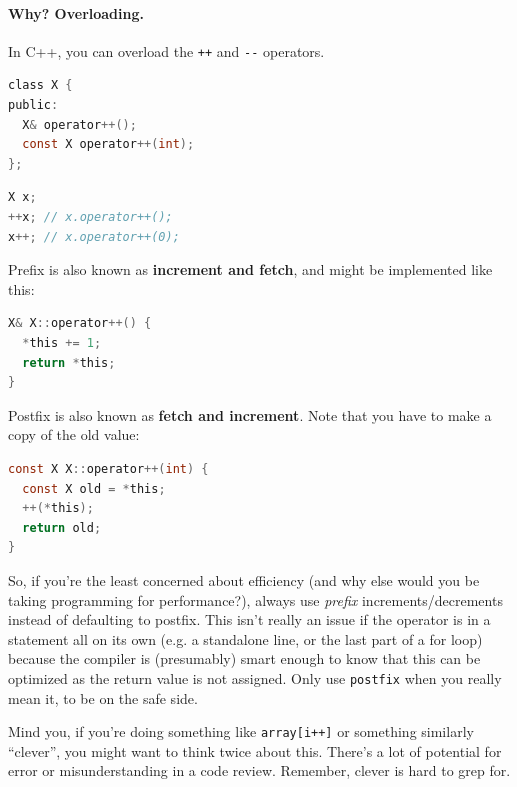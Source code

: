 \documentclass[a4paper]{report}
\begin{document}
\paragraph{Why? Overloading.} In C++, you can overload the {\tt ++} and {\tt -\!-} operators.

\vspace*{-1em}
\begin{minipage}{.5\textwidth}
  \begin{lstlisting}[language=C]
class X {
public:
  X& operator++();
  const X operator++(int);
};
\end{lstlisting}\end{minipage}\begin{minipage}{.5\textwidth}
  \begin{lstlisting}[language=C]
X x;
++x; // x.operator++();
x++; // x.operator++(0);
  \end{lstlisting}
  \end{minipage}

Prefix is also known as {\bf increment and fetch}, and might be implemented like this:
  \begin{lstlisting}[language=C]
X& X::operator++() {
  *this += 1;
  return *this;
}
  \end{lstlisting}

  Postfix is also known as {\bf fetch and increment}. Note that you have to make a copy of
the old value:
  \begin{lstlisting}[language=C]
const X X::operator++(int) {
  const X old = *this;
  ++(*this);
  return old;
}
  \end{lstlisting}

So, if you're the least concerned about efficiency (and why else would you be
taking programming for performance?), always use
  \emph{prefix} increments/decrements instead of defaulting to postfix. This isn't really an issue if the operator is in a statement all on its own (e.g. a standalone line, or the last part of a for loop) because the compiler is (presumably) smart enough to know that this can be optimized as the return value is not assigned. Only use {\tt postfix} when you really mean it, to be on the safe side.
  
Mind you, if you're doing something like \texttt{array[i++]} or something similarly ``clever'', you might want to think twice about this. There's a lot of potential for error or misunderstanding in a code review. Remember, clever is hard to grep for.
\end{document}
